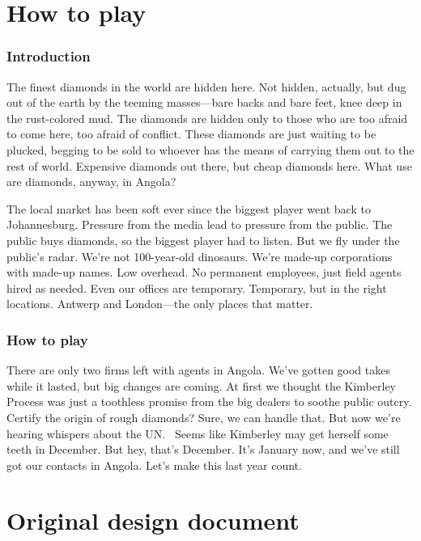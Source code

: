 \documentclass[8pt]{extbook}
\begin{document}
\tableofcontents

\part{How to play}
\addtocounter{chapter}{1}
\setcounter{section}{0}

\section{Introduction}
The finest diamonds in the world are hidden here.  Not hidden, actually, but dug out of the earth by the teeming masses---bare backs and bare feet, knee deep in the rust-colored mud.  The diamonds are hidden only to those who are too afraid to come here, too afraid of conflict.  These diamonds are just waiting to be plucked, begging to be sold to whoever has the means of carrying them out to the rest of world.  Expensive diamonds out there, but cheap diamonds here.  What use are diamonds, anyway, in Angola?

The local market has been soft ever since the biggest player went back to Johannesburg.   Pressure from the media lead to pressure from the public.  The public buys diamonds, so the biggest player had to listen.  But we fly under the public's radar.  We're not 100-year-old dinosaurs.  We're made-up corporations with made-up names.  Low overhead.  No permanent employees, just field agents hired as needed.  Even our offices are temporary.  Temporary, but in the right locations.  Antwerp and London---the only places that matter.


\section{How to play}
There are only two firms left with agents in Angola.  We've gotten good takes while it lasted, but big changes are coming.  At first we thought the Kimberley Process was just a toothless promise from the big dealers to soothe public outcry.  Certify the origin of rough diamonds?  Sure, we can handle that.  But now we're hearing whispers about the UN. \ Seems like Kimberley may get herself some teeth in December.  But hey, that's December.  It's January now, and we've still got our contacts in Angola.  Let's make this last year count.


\part{Original design document}
\addtocounter{chapter}{1}
\setcounter{section}{0}
\end{document}
